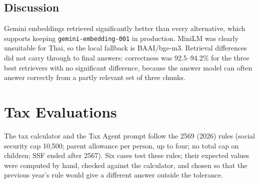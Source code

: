 \documentclass[11pt,a4paper]{article}
\begin{document}
\subsection{Discussion}
Gemini embeddings retrieved significantly better than every alternative, which supports keeping \texttt{gemini-embedding-001} in production. MiniLM was clearly unsuitable for Thai, so the local fallback is BAAI/bge-m3. Retrieval differences did not carry through to final answers: correctness was 92.5--94.2\% for the three best retrievers with no significant difference, because the answer model can often answer correctly from a partly relevant set of three chunks.

\section{Tax Evaluations}

The tax calculator and the Tax Agent prompt follow the 2569 (2026) rules (social security cap 10,500; parent allowance per person, up to four; no total cap on children; SSF ended after 2567). Six cases test these rules; their expected values were computed by hand, checked against the calculator, and chosen so that the previous year's rule would give a different answer outside the tolerance.
\end{document}
